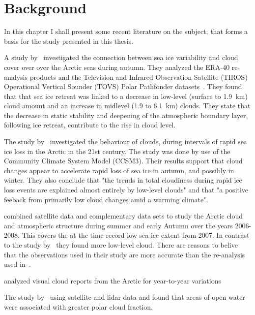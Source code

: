 \chapter{Background}%
\label{chap:background}
In this chapter I shall present some recent literature on the subject, that forms a basis for the study presented in this thesis.

A study by~\citet{Schweiger2008} investigated the connection between sea ice variability and cloud cover over over the Arctic seas during autumn. They analyzed the ERA-40 re-analysis products and the Television and Infrared Observation Satellite (TIROS) Operational Vertical Sounder (TOVS) Polar Pathfonder datasets~\citep{Schweiger2008}. They found that that sea ice retreat was linked to a decrease in low-level (surface to \tilde{ }1.9~km) cloud amount and an increase in midlevel (\tilde{ }1.9 to 6.1~km) clouds. They state that the decrease in static stability and deepening of the atmospheric boundary layer, following ice retreat, contribute to the rise in cloud level. 

The study by~\citet{Vavrus2010} investigated the behaviour of clouds, during intervals of rapid sea ice loss in the Arctic in the 21st century. The study was done by use of the Community Climate System Model (CCSM3). Their results support that cloud changes appear to accelerate rapid loss of sea ice in autumn, and possibly in winter. They also conclude that "the trends in total cloudiness during rapid ice loss events are explained almost entirely by low-level clouds" and that "a positive feeback from primarily low cloud changes amid a warming climate".

\citet{Kay2009} combined satellite data and complementary data sets to study the Arctic cloud and atmospheric structure during summer and early Autumn over the years 2006-2008. This covers the at the time record low sea ice extent from 2007. In contrast to the study by~\citet{Schweiger2008} they found more low-level cloud. There  are reasons to belive that the observations used in their study are more accurate than the re-analysis used in~\citet{Schweiger2008}.


\citet{Eastman2010a} analyzed visual cloud reports from the Arctic for year-to-year variations 

The study by~\citet{Palm2010} using satellite and lidar data and found that areas of open water were associated with greater polar cloud fraction. %


